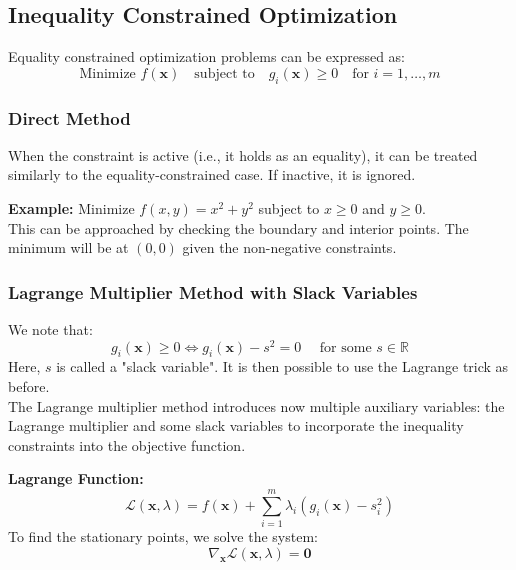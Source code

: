 \documentclass[]{article}
\newcommand{\R}{\mathbb{R}}
\begin{document}
	\subsection{Inequality Constrained Optimization}
	Equality constrained optimization problems can be expressed as:
	$$
	\text{Minimize } f(\mathbf{x})
	\quad
	\text{subject to}
	\quad
	g_i(\mathbf{x}) \geq 0
	\quad
	\text{for } i = 1, \dots, m
	$$
	
	\subsubsection{Direct Method}
	When the constraint is active (i.e., it holds as an equality), it can be treated similarly to the equality-constrained case.
	If inactive, it is ignored.
	
	\textbf{Example:}
	Minimize $f(x, y) = x^2 + y^2$ subject to $x \geq 0$ and $y \geq 0$.
	\\
	This can be approached by checking the boundary and interior points. The minimum will be at $(0,0)$ given the non-negative constraints.
	
	\subsubsection{Lagrange Multiplier Method with Slack Variables}
	We note that:
	$$
	g_i(\mathbf{x}) \geq 0
	\iff
	g_i(\mathbf{x}) -s^2 = 0
	\quad
	\text{ for some } s \in \R
	$$
	Here, $s$ is called a "slack variable".
	It is then possible to use the Lagrange trick as before.
	\\
	The Lagrange multiplier method introduces now multiple auxiliary variables: the Lagrange multiplier and some slack variables to incorporate the inequality constraints into the objective function.
	
	\textbf{Lagrange Function:}
	$$
	\mathcal{L}(\mathbf{x}, \lambda)
	= f(\mathbf{x}) + \sum_{i=1}^m \lambda_i \left( g_i(\mathbf{x}) - s_i^2 \right)
	$$
	To find the stationary points, we solve the system:
	$$
	\nabla_\mathbf{x} \mathcal{L}(\mathbf{x}, \lambda) = \mathbf{0}
	$$
	
	
\end{document}
